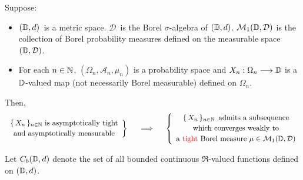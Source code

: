 \begin{theorem}
\mbox{}\vskip 0.1cm
\noindent
Suppose:
\begin{itemize}
\item
	$(\mathbb{D},d)$\, is a metric space.
	$\mathcal{D}$\, is the Borel $\sigma$-algebra of $(\mathbb{D},d)$.
	\vskip 0.0cm
	$\mathcal{M}_{1}(\mathbb{D},\mathcal{D})$ is the collection of Borel probability measures
	defined on the measurable space $(\mathbb{D},\mathcal{D})$.
\item
	For each $n \in \mathbb{N}$,
	$(\Omega_{n},\mathcal{A}_{n},\mu_{n})$ is a probability space and
	$X_{n} : \Omega_{n} \longrightarrow \mathbb{D}$
	is a $\mathbb{D}$-valued map (not necessarily Borel measurable) defined on $\Omega_{n}$.
\end{itemize}
Then,
\begin{equation*}
	\left.\begin{array}{c}
	\textnormal{$\{\,X_{n}\,\}_{n\in\N}$ is asymptotically tight}
	\\
	\overset{{\color{white}.}}{\textnormal{and asymptotically measurable}}
	\end{array}\right\}
\quad\;\;\Longrightarrow\quad\;\,
	\left\{\begin{array}{c}
	\textnormal{$\{\,X_{n}\,\}_{n\in\N}$\, admits a subsequence}
	\\
	\textnormal{$\overset{{\color{white}.}}{\textnormal{which}}$ converges weakly to}
	\\
	\textnormal{a {\color{red}tight} $\overset{{\color{white}.}}{\textnormal{Borel}}$
		measure $\mu\in\mathcal{M}_{1}(\D,\mathcal{D})$}
	\end{array}\right.
\end{equation*}
\end{theorem}
\proof
Let $C_{b}(\mathbb{D},d)$ denote the set of all bounded continuous $\Re$-valued
functions defined on $(\mathbb{D},d)$.

